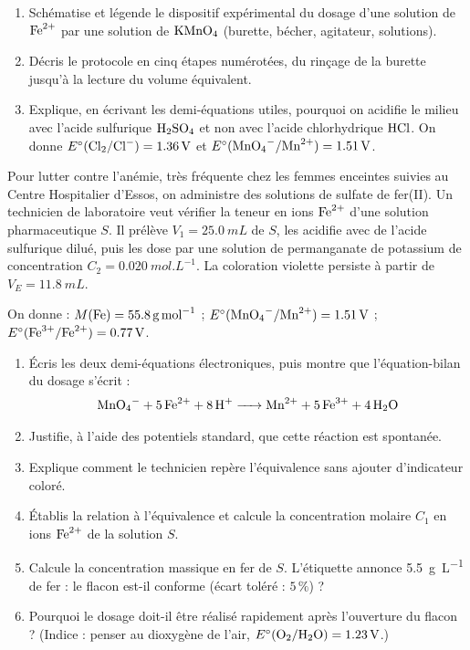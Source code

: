 \documentclass[11pt]{article}
\newcounter{popsec}
\newcounter{popsub}
\newcommand{\courssub}[1]{%
  \stepcounter{popsub}%
  \par\vspace{9pt}\noindent{\popxbold\fontsize{11.5}{13}\selectfont\color{popink}{\color{poporange}\thepopsec.\thepopsub}\hspace{6pt}#1}\par\nopagebreak\vspace{4pt}
}
\begin{document}
\begin{exercice}
\begin{enumerate}
\item Schématise et légende le dispositif expérimental du dosage d'une solution de $\ce{Fe^2+}$ par une solution de $\ce{KMnO4}$ (burette, bécher, agitateur, solutions).
\item Décris le protocole en cinq étapes numérotées, du rinçage de la burette jusqu'à la lecture du volume équivalent.
\item Explique, en écrivant les demi-équations utiles, pourquoi on acidifie le milieu avec l'acide sulfurique $\ce{H2SO4}$ et non avec l'acide chlorhydrique $\ce{HCl}$. On donne $E^\circ(\ce{Cl2}/\ce{Cl-}) = \SI{1,36}{V}$ et $E^\circ(\ce{MnO4-}/\ce{Mn^2+}) = \SI{1,51}{V}$.
\end{enumerate}
\end{exercice}

\courssub{Je me prépare au Probatoire}

\begin{exercice}
Pour lutter contre l'anémie, très fréquente chez les femmes enceintes suivies au Centre Hospitalier d'Essos, on administre des solutions de sulfate de fer(II). Un technicien de laboratoire veut vérifier la teneur en ions $\ce{Fe^2+}$ d'une solution pharmaceutique $S$. Il prélève $V_1 = \SI{25,0}{mL}$ de $S$, les acidifie avec de l'acide sulfurique dilué, puis les dose par une solution de permanganate de potassium de concentration $C_2 = \SI{0,020}{mol.L^{-1}}$. La coloration violette persiste à partir de $V_E = \SI{11,8}{mL}$.

On donne : $M(\ce{Fe}) = \SI{55,8}{g.mol^{-1}}$ ; $E^\circ(\ce{MnO4-}/\ce{Mn^2+}) = \SI{1,51}{V}$ ; $E^\circ(\ce{Fe^3+}/\ce{Fe^2+}) = \SI{0,77}{V}$.
\begin{enumerate}
\item Écris les deux demi-équations électroniques, puis montre que l'équation-bilan du dosage s'écrit :
\[ \ce{MnO4- + 5Fe^2+ + 8H+ -> Mn^2+ + 5Fe^3+ + 4H2O} \]
\item Justifie, à l'aide des potentiels standard, que cette réaction est spontanée.
\item Explique comment le technicien repère l'équivalence sans ajouter d'indicateur coloré.
\item Établis la relation à l'équivalence et calcule la concentration molaire $C_1$ en ions $\ce{Fe^2+}$ de la solution $S$.
\item Calcule la concentration massique en fer de $S$. L'étiquette annonce \SI{5,5}{g.L^{-1}} de fer : le flacon est-il conforme (écart toléré : $5\,\%$) ?
\item Pourquoi le dosage doit-il être réalisé rapidement après l'ouverture du flacon ? (Indice : penser au dioxygène de l'air, $E^\circ(\ce{O2}/\ce{H2O}) = \SI{1,23}{V}$.)
\end{enumerate}
\end{exercice}
\end{document}
